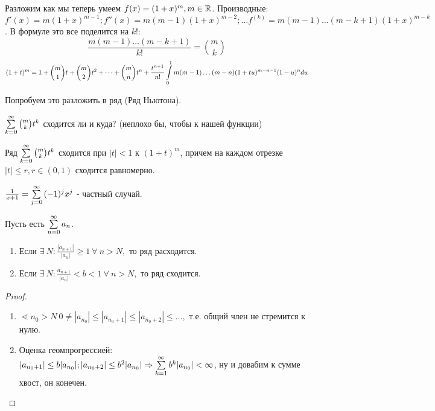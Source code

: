 \documentclass[12pt]{report}
\begin{document}
\begin{ex}
Разложим как мы теперь умеем $f(x) = (1 + x)^m, m \in \mathbb{R}$.
Производные: $f'(x) = m(1 + x)^{m - 1}; f''(x) = m(m - 1)(1 + x)^{m - 2}; \dots f^{(k)} = m(m - 1) \dots (m - k + 1)(1 + x)^{m - k}$. В формуле это все поделится на $k!:$
$$\frac{m(m - 1)\dots (m - k + 1)}{k!} = \binom{m}{k}$$
$$(1 + t)^m = 1 + \binom{m}{1}t + \binom{m}{2}t^2 + \dots + \binom{m}{n}t^n + \frac{t^{n + 1}}{n!}\int\limits_0^1{m(m - 1)\dots (m - n)(1 + tu)^{m - n - 1}(1 - u)^n du}$$

Попробуем это разложить в ряд (Ряд Ньютона).

$\sum\limits_{k = 0}^\infty{\binom{m}{k}t^k}$ сходится ли и куда? (неплохо бы, чтобы к нашей функции)
\end{ex}

\begin{thm}
Ряд $\sum\limits_{k = 0}^\infty{\binom{m}{k}t^k}$ сходится при $|t| < 1$ к $(1 + t)^m$, причем на каждом отрезке $|t| \le r, r \in (0, 1)$ сходится равномерно.
\end{thm}

\begin{rem}
$\frac{1}{x + 1} = \sum\limits_{j = 0}^\infty{(-1)^jx^j}$ - частный случай.
\end{rem}

\begin{thm}
Пусть есть $\sum\limits_{n = 0}^\infty{a_n}$. 
\begin{enumerate}
\item Если $\exists ~N: \frac{|a_{n + 1}|}{|a_n|} \ge 1 ~\forall ~n > N,$ то ряд расходится.
\item Если $\exists ~N: \frac{a_{n + 1}}{|a_n|} < b < 1 ~\forall ~n > N,$ то ряд сходится.
\end{enumerate}
\end{thm}

\begin{proof}
\begin{enumerate}
\item $\lessdot n_0 > N ~0\neq|a_{n_0}| \le |a_{n_0 + 1}| \le |a_{n_0 + 2}| \le \dots,$ т.е. общий член не стремится к нулю.
\item Оценка геомпрогрессией: $|a_{n_0 + 1}| \le b|a_{n_0}|; |a_{n_0 + 2}| \le b^2|a_{n_0}| \Rightarrow \sum\limits_{k = 1}^\infty{b^k|a_{n_0}|} < \infty$, ну и довабим к сумме хвост, он конечен. 
\end{enumerate}
\end{proof}
\end{document}

